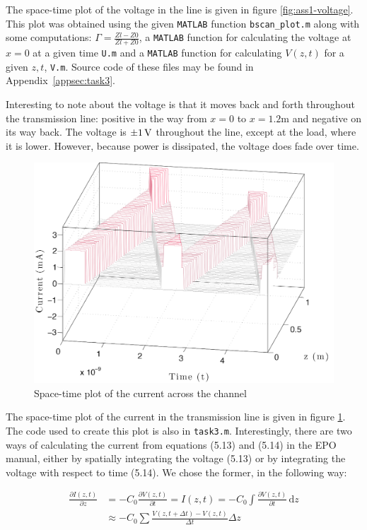 \documentclass[11pt,titlepage]{report}
\begin{document}
The space-time plot of the voltage in the line is given in figure \ref{fig:ass1-voltage}. This plot was obtained using the given \texttt{MATLAB} function \texttt{bscan\_plot.m} along with some computations: $\Gamma=\frac{Zl-Z0}{Zl+Z0}$, a \texttt{MATLAB} function for calculating the voltage at $x=0$ at a given time \texttt{U.m} and a \texttt{MATLAB} function for calculating $V(z,t)$ for a given $z,t$, \texttt{V.m}. Source code of these files may be found in Appendix~\ref{appsec:task3}.

Interesting to note about the voltage is that it moves back and forth throughout the transmission line: positive in the way from $x=0$ to $x=1.2$m and negative on its way back. The voltage is $\SI{\pm1}{V}$ throughout the line, except at the load, where it is lower. However, because power is dissipated, the voltage does fade over time.

\begin{figure}[H]
	\centering
	\includegraphics[width=.85\linewidth]{resource/current-cropped.pdf}
	\caption{Space-time plot of the current across the channel}
	\label{fig:ass1-current}
\end{figure}

The space-time plot of the current in the transmission line is given in figure \ref{fig:ass1-current}. The code used to create this plot is also in \texttt{task3.m}. Interestingly, there are two ways of calculating the current from equations (5.13) and (5.14) in the EPO manual, either by spatially integrating the voltage (5.13) or by integrating the voltage with respect to time (5.14). We chose the former, in the following way:

\begin{align}
\frac{\partial I(z,t)}{\partial z}&=-C_0\frac{\partial V(z,t)}{\partial t} = I(z,t)=-C_0\int \! \frac{\partial V(z,t)}{\partial t}\, \mathrm{d}z \nonumber \\
&\approx -C_0\sum\frac{V(z,t+\Delta t)-V(z,t)}{\Delta t}\Delta z
\end{align}
\end{document}
